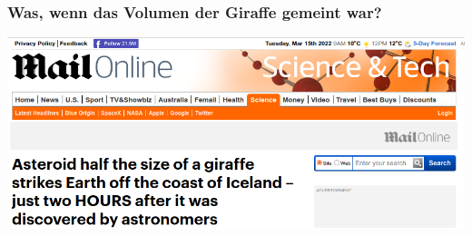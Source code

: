 \documentclass{beamer}
\begin{document}
\begin{frame}
\frametitle{Was, wenn das Volumen der Giraffe gemeint war?}

\begin{center}
\includegraphics[width=\textwidth]{giraffe.png}
\end{center}

\end{frame}
\end{document}
